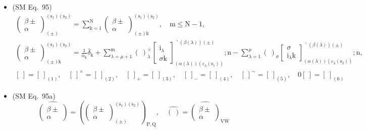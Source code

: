\documentclass[
    12pt,              %
    a4paper,           %
    headings=normal,   %
    twoside=true,      %
    BCOR=8mm,          %
]{scrbook}
\begin{document}
\begin{itemize}[label={},leftmargin=0pt]
    \item (SM Eq.\ 95) 
    \[
    \begin{gathered}
    \left( \begin{smallmatrix} \beta \pm \\ \alpha \end{smallmatrix} \right)^{(\mathrm{s_1})(\mathrm{s_2})}_{(\pm)} = \sum_{\mathrm{k}=1}^\mathrm{N} \left( \begin{smallmatrix} \beta \pm \\ \alpha \end{smallmatrix} \right)^{(\mathrm{s_1})(\mathrm{s_2})}_{(\pm)\mathrm{k}}, \quad \mathrm{m} \le \mathrm{N}-1, \\
    \left( \begin{smallmatrix} \beta \pm \\ \alpha \end{smallmatrix} \right)^{(\mathrm{s_1})(\mathrm{s_2})}_{(\pm)\mathrm{k}} = \frac{1}{\alpha_\mathrm{k}} \bar{\delta}_\mathrm{k} + \sum_{\lambda=\mu+1}^\mathrm{m} (\ )^{\bar{\times}}_\lambda \left[ \begin{smallmatrix} \mathrm{i}_\lambda \\ \sigma \mathrm{k} \end{smallmatrix} \right]^{\urcorner(\beta(\lambda))(\pm)}_{(\alpha(\lambda))(\varepsilon_\lambda(\mathrm{s_1}))} ; \mathrm{n} - \sum_{\lambda=1}^\mu (\ )_\sigma \left[ \begin{smallmatrix} \sigma \\ \mathrm{i}_\lambda \mathrm{k} \end{smallmatrix} \right]^{\urcorner(\beta(\lambda))(\pm)}_{(\alpha(\lambda))(\varepsilon_\lambda(\mathrm{s_2}))} ; \mathrm{n}, \\
    [ \ ] = [ \ ]_{(1)}, \quad [ \ ]^\times = [ \ ]_{(2)}, \quad [ \ ]_+ = [ \ ]_{(3)}, \quad [ \ ]_- = [ \ ]_{(4)}, \quad [ \ ]^\sim = [ \ ]_{(5)}, \quad 0[ \ ] = [ \ ]_{(6)}
    \end{gathered}
    \]

    \item (SM Eq.\ 95a) 
    \[
    \widehat{\left( \begin{smallmatrix} \beta \pm \\ \alpha \end{smallmatrix} \right)} = \left( \left( \begin{smallmatrix} \beta \pm \\ \alpha \end{smallmatrix} \right)^{(\mathrm{s}_1)(\mathrm{s}_2)}_{(\pm)} \right)_{\mathrm{P,Q}}, \quad \widehat{(\ )} = \widehat{\left( \begin{smallmatrix} \beta \pm \\ \alpha \end{smallmatrix} \right)}_{\mathrm{VW}}
    \]


\end{itemize}
\end{document}
